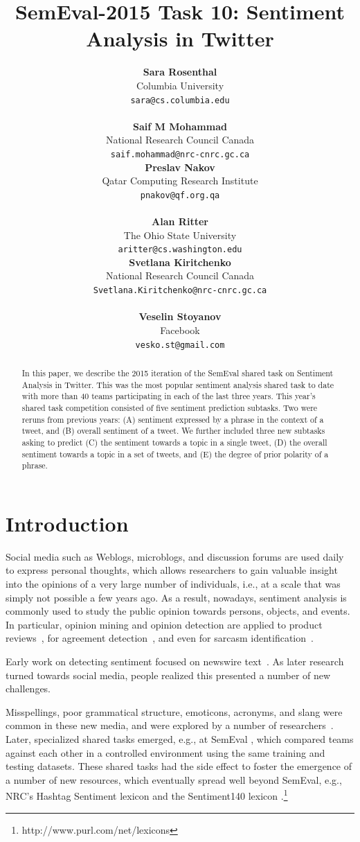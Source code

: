 \documentclass[11pt]{article}
\title{SemEval-2015 Task 10: Sentiment Analysis in Twitter}
\author{
{\bf Sara Rosenthal }\\{\small Columbia University}\\{\scriptsize {\tt sara@cs.columbia.edu}}\\\\
{\bf Saif M Mohammad}\\{\small National Research Council Canada}\\{\scriptsize {\tt saif.mohammad@nrc-cnrc.gc.ca}}\\
\And
{\bf Preslav Nakov}\\{\small Qatar Computing Research Institute}\\{\scriptsize {\tt pnakov@qf.org.qa}}\\\\
{\bf Alan Ritter}\\{\small The Ohio State University}\\{\scriptsize {\tt aritter@cs.washington.edu}}\\
\And
{\bf Svetlana Kiritchenko}\\{\small National Research Council Canada}\\{\scriptsize {\tt Svetlana.Kiritchenko@nrc-cnrc.gc.ca}}\\\\
{\bf Veselin Stoyanov}\\{\small Facebook}\\{\scriptsize {\tt vesko.st@gmail.com}}\\
}
\date{}
\begin{document}
\maketitle
\begin{abstract}
In this paper, we describe the 2015 iteration of the SemEval shared task on Sentiment Analysis in Twitter.  This was the most popular sentiment analysis shared task to date with more than 40 teams participating in each of the last three years. This year's shared task competition consisted of five sentiment prediction subtasks. Two were reruns from previous years: (A) sentiment expressed by a phrase in the context of a tweet, and (B) overall sentiment of a tweet. We further included three new subtasks asking to predict (C) the sentiment towards a topic in a single tweet, (D) the overall sentiment towards a topic in a set of tweets, and (E) the degree of prior polarity of a phrase.
\end{abstract}

\section{Introduction}

Social media such as Weblogs, microblogs, and discussion forums are used daily to express personal thoughts, which allows researchers to gain valuable insight into the opinions of a very large number of individuals, i.e., at a scale that was simply not possible a few years ago. As a result, nowadays, sentiment analysis is commonly used to study the public opinion towards persons, objects, and events. In particular, opinion mining and opinion detection are applied to product reviews~\cite{Hu04}, for agreement detection~\cite{conf/naacl/HillardOS03}, and even for sarcasm identification~\cite{conf/acl/Gonzalez-IbanezMW11,liebrecht-kunneman-vandenbosch:2013:WASSA}.

Early work on detecting sentiment focused on newswire text~\cite{Wiebe05,swn,Pang:2002:TUS,Hu04}.
As later research turned towards social media,
people realized this presented a number of new challenges.


Misspellings, poor grammatical structure, emoticons, acronyms, and slang were common in these new media,
and were explored by a number of researchers~\cite{Barbosa10,Bifet11,Davidov10,Jansen09,Kouloumpis11,oconnor10,Pak10}. Later, specialized shared tasks emerged, e.g., at SemEval \cite{Semeval2013,rosenthal-EtAl:2014:SemEval}, which compared teams against each other in a controlled environment using the same training and testing datasets. These shared tasks had the side effect to foster the emergence of a number of new resources, which eventually spread well beyond SemEval, e.g., NRC's Hashtag Sentiment lexicon and the Sentiment140 lexicon \cite{MohammadKZ2013}.\footnote{http://www.purl.com/net/lexicons}
\end{document}
